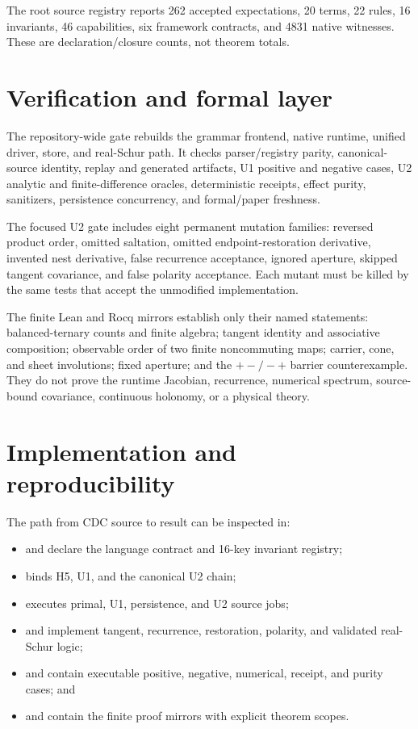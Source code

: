 \documentclass[11pt]{article}
\begin{document}
The root source registry reports 262 accepted expectations, 20 terms, 22 rules,
16 invariants, 46 capabilities, six framework contracts, and 4831 native
witnesses. These are declaration/closure counts, not theorem totals.

\section{Verification and formal layer}

The repository-wide gate rebuilds the grammar frontend, native runtime, unified
driver, store, and real-Schur path. It checks parser/registry parity,
canonical-source identity, replay and generated artifacts, U1 positive and
negative cases, U2 analytic and finite-difference oracles, deterministic
receipts, effect purity, sanitizers, persistence concurrency, and formal/paper
freshness.

The focused U2 gate includes eight permanent mutation families: reversed
product order, omitted saltation, omitted endpoint-restoration derivative,
invented nest derivative, false recurrence acceptance, ignored aperture,
skipped tangent covariance, and false polarity acceptance. Each mutant must be
killed by the same tests that accept the unmodified implementation.

The finite Lean and Rocq mirrors establish only their named statements:
balanced-ternary counts and finite algebra; tangent identity and associative
composition; observable order of two finite noncommuting maps; carrier, cone,
and sheet involutions; fixed aperture; and the $+-/-+$ barrier counterexample.
They do not prove the runtime Jacobian, recurrence, numerical spectrum,
source-bound covariance, continuous holonomy, or a physical theory.

\section{Implementation and reproducibility}

The path from CDC source to result can be inspected in:
\begin{itemize}
\item {} and  declare the language contract and
  16-key invariant registry;
\item {} binds H5, U1, and the canonical U2 chain;
\item {} executes primal, U1, persistence, and
  U2 source jobs;
\item {} and  implement
  tangent, recurrence, restoration, polarity, and validated real-Schur logic;
\item {} and  contain executable positive,
  negative, numerical, receipt, and purity cases; and
\item {} and  contain the finite proof
  mirrors with explicit theorem scopes.
\end{itemize}
\end{document}
